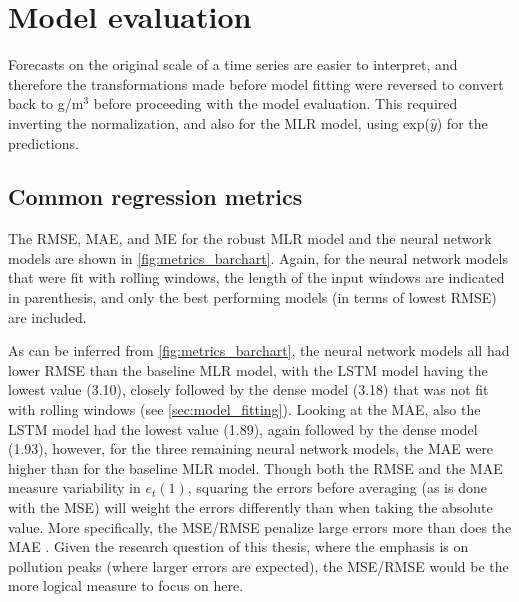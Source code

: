 
\section{Model evaluation}
Forecasts on the original scale of a time series are easier to interpret, and therefore the transformations made before model fitting were reversed to convert back to \textmugreek g/m$^3$ before proceeding with the model evaluation. This required inverting the normalization, and also for the MLR model, using exp($\hat{y}$) for the predictions. 

\subsection{Common regression metrics}
The RMSE, MAE, and ME for the robust MLR model and the neural network models are shown in \cref{fig:metrics_barchart}. Again, for the neural network models that were fit with rolling windows, the length of the input windows are indicated in parenthesis, and only the best performing models (in terms of lowest RMSE) are included. 

As can be inferred from \cref{fig:metrics_barchart}, the neural network models all had lower RMSE than the baseline MLR model, with the LSTM model having the lowest value (3.10), closely followed by the dense model (3.18) that was not fit with rolling windows (see \cref{sec:model_fitting}). Looking at the MAE, also the LSTM model had the lowest value (1.89), again followed by the dense model (1.93), however, for the three remaining neural network models, the MAE were higher than for the baseline MLR model. Though both the RMSE and the MAE measure variability in $e_t(1)$, squaring the errors before averaging (as is done with the MSE) will weight the errors differently than when taking the absolute value. More specifically, the MSE/RMSE penalize large errors more than does the MAE \cite{reg_metrics2018}.
Given the research question of this thesis, where the emphasis is on pollution peaks (where larger errors are expected), the MSE/RMSE would be the more logical measure to focus on here. 

